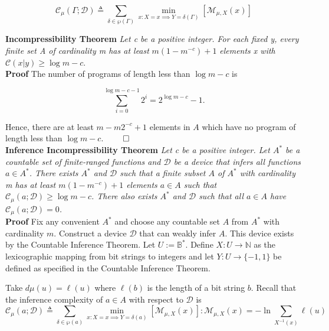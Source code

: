 \documentclass[11pt]{article}
\newcommand{\N}{\mathbb{N}}
\newcommand{\B}{\mathbb{B}}
\begin{document}
$$ \mathcal{C}_{\mu}(\Gamma ; \mathcal{D}) \triangleq \sum_{\delta \in \wp(\Gamma)} \min_{x : X = x \implies Y = \delta(\Gamma) } [\mathcal{M}_{\mu, X} (x)]	$$ 

\bigskip
\textbf{Incompressibility Theorem} \quad \textit{Let c be a positive integer. For each fixed y, every finite set A of cardinality m has at least} $ m(1 - m^{-c}) + 1 $ \textit{elements x with} $ \mathcal{C}(x|y) \geq \log m - c $. \\
\textbf{Proof} \quad The number of programs of length less than $ \log m - c $ is 

$$ \sum_{i = 0}^{\log m - c - 1} {2^i} = 2^{\log m - c} - 1. $$

Hence, there are at least $ m - m2^{-c} + 1 $ elements in $ A $ which have no program of length less than $ \log m - c $. $ \hfill \qed $ \\


\newpage
\bigskip
\textbf{Inference Incompressibility Theorem} \quad \textit{Let c be a positive integer. Let $ A^{*} $ be a countable set of finite-ranged functions and $ \mathcal{D} $ be a device that infers all functions $ a \in A^{*} $. There exists $ A^{*} $ and $ \mathcal{D} $ such that a finite subset $ A $ of $ A^{*} $ with cardinality m has at least $ m(1 - m^{-c}) + 1 $ elements $ a \in A $ such that $ \mathcal{C}_{\mu}(a;\mathcal{D}) \geq \log m - c $. There also exists $ A^{*} $ and $ \mathcal{D} $ such that all $ a \in A $ have $ \mathcal{C}_{\mu}(a;\mathcal{D}) = 0 $. } \\

\textbf{Proof} \quad Fix any convenient $ A^{*} $ and choose any countable set $ A $ from $ A^{*} $ with cardinality $ m $. Construct a device $ \mathcal{D} $ that can weakly infer $ A $. This device exists by the Countable Inference Theorem. Let $ U := \B^{*} $. Define $ X: U \rightarrow \N $ as the lexicographic mapping from bit strings to integers and let $ Y:U \rightarrow \{-1, 1\} $ be defined as specified in the Countable Inference Theorem.

\bigskip
Take $ d\mu(u) = \ell(u) $ where $ \ell(b) $ is the length of a bit string $ b $. Recall that the inference complexity of $ a \in A $ with respect to $ \mathcal{D} $ is
$$ \mathcal{C}_{\mu}(a ; \mathcal{D}) \triangleq \sum_{\delta \in \wp(a)} \min_{x : X = x \implies Y = \delta(a) } [\mathcal{M}_{\mu, X} (x)]: \mathcal{M}_{\mu, X} (x) = - \ln \sum_{X^{-1}(x)} {\ell(u)} $$
\end{document}
